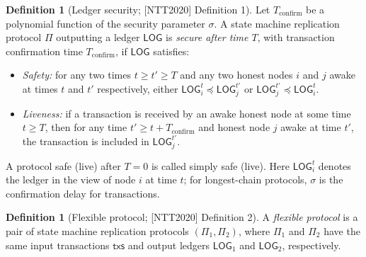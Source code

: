 \documentclass[11pt,a4paper]{article}
\theoremstyle{definition}
\newtheorem{definition}[theorem]{Definition}
\begin{document}
\begin{definition}[Ledger security; {[NTT2020]} Definition 1]
\label{def:xl-ledger-security}
Let $T_{\mathrm{confirm}}$ be a polynomial function of the security
parameter $\sigma$. A state machine replication protocol $\Pi$ outputting
a ledger $\mathsf{LOG}$ is \emph{secure after time $T$}, with transaction
confirmation time $T_{\mathrm{confirm}}$, if $\mathsf{LOG}$ satisfies:
\begin{itemize}
\item \emph{Safety:} for any two times $t \ge t' \ge T$ and any two honest
  nodes $i$ and $j$ awake at times $t$ and $t'$ respectively, either
  $\mathsf{LOG}_i^t \preceq \mathsf{LOG}_j^{t'}$ or
  $\mathsf{LOG}_j^{t'} \preceq \mathsf{LOG}_i^t$.
\item \emph{Liveness:} if a transaction is received by an awake honest
  node at some time $t \ge T$, then for any time
  $t' \ge t + T_{\mathrm{confirm}}$ and honest node $j$ awake at time
  $t'$, the transaction is included in $\mathsf{LOG}_j^{t'}$.
\end{itemize}
A protocol safe (live) after $T = 0$ is called simply safe (live). Here
$\mathsf{LOG}_i^t$ denotes the ledger in the view of node $i$ at time $t$;
for longest-chain protocols, $\sigma$ is the confirmation delay for
transactions.
\end{definition}

\begin{definition}[Flexible protocol; {[NTT2020]} Definition 2]
\label{def:xl-flexible}
A \emph{flexible protocol} is a pair of state machine replication
protocols $(\Pi_1, \Pi_2)$, where $\Pi_1$ and $\Pi_2$ have the same input
transactions $\mathsf{txs}$ and output ledgers $\mathsf{LOG}_1$ and
$\mathsf{LOG}_2$, respectively.
\end{definition}
\end{document}

